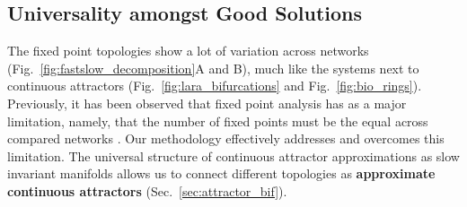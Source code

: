 \documentclass{article} %
\newcommand{\mpcomment}[1]{\textcolor{mpcolor}{(#1)}}
\newcounter{ct}
\theoremstyle{definition}
\theoremstyle{remark}
\begin{document}
\subsection{Universality amongst Good Solutions}

The fixed point topologies show a lot of variation across networks (Fig.~\ref{fig:fastslow_decomposition}A and B),
 much like the systems next to continuous attractors (Fig.~\ref{fig:lara_bifurcations} and Fig.~\ref{fig:bio_rings}).
Previously, it has been observed that  fixed point analysis  has as a major limitation, namely, that the number of fixed points must be the equal across compared networks  \citep{maheswaranathan2019universality}.
Our methodology effectively addresses and overcomes this limitation.
The universal structure of continuous attractor approximations as slow invariant manifolds allows us to connect different topologies as \textbf{approximate continuous attractors} (Sec.~\ref{sec:attractor_bif}).


\end{document}
